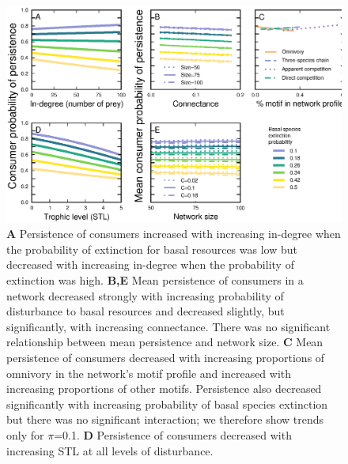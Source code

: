 \documentclass[12pt]{article}
\begin{document}
\begin{spacing}{2.0}
    \begin{figure}[ht!]
        \centering
        \includegraphics[width=\textwidth]{figures/persistence_vs_SC_lm.eps}
        \caption{
        \textbf{A} Persistence of consumers increased with increasing in-degree when the probability of extinction for basal resources was low but decreased with increasing in-degree when the probability of extinction was high.
        \textbf{B,E} Mean persistence of consumers in a network decreased strongly with increasing probability of disturbance to basal resources and decreased slightly, but significantly, with increasing connectance. There was no significant relationship between mean persistence and network size.
        \textbf{C} Mean persistence of consumers decreased with increasing proportions of omnivory in the network's motif profile and increased with increasing proportions of other motifs. Persistence also decreased significantly with increasing probability of basal species extinction but there was no significant interaction; we therefore show trends only for $\pi$=0.1.
        \textbf{D} Persistence of consumers decreased with increasing STL at all levels of disturbance.}
        \label{fig:lm_CS}
    \end{figure}




\end{spacing}
\end{document}
